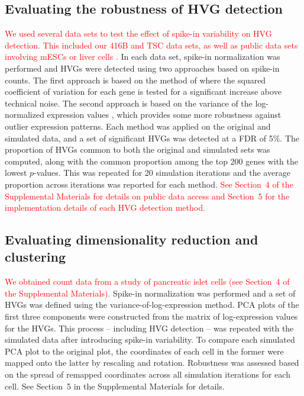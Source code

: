 \documentclass{article}
\newcommand{\suppsecdata}{4}
\newcommand{\suppsecsim}{5}
\newcommand{\revised}[1]{\textcolor{red}{#1}}
\begin{document}
\subsection*{Evaluating the robustness of HVG detection}
\revised{We used several data sets to test the effect of spike-in variability on HVG detection.
This included our 416B and TSC data sets, as well as public data sets involving mESCs \autocite{kolod2015single} or liver cells \autocite{scialdone2015computational}.}
In each data set, spike-in normalization was performed and HVGs were detected using two approaches based on spike-in counts.
The first approach is based on the method of \cite{brennecke2013accounting} where the squared coefficient of variation for each gene is tested for a significant increase above technical noise.
The second approach is based on the variance of the log-normalized expression values \autocite{lun2016stepbystep}, which provides some more robustness against outlier expression patterns.
Each method was applied on the original and simulated data, and a set of significant HVGs was detected at a FDR of 5\%.
The proportion of HVGs common to both the original and simulated sets was computed, along with the common proportion among the top 200 genes with the lowest $p$-values.
This was repeated for 20 simulation iterations and the average proportion across iterations was reported for each method.
\revised{See Section~\suppsecdata{} of the Supplemental Materials for details on public data access and Section~\suppsecsim{} for the implementation details of each HVG detection method.}

\subsection*{Evaluating dimensionality reduction and clustering}
\revised{We obtained count data from a study of pancreatic islet cells \autocite{segerstople2016single} (see Section~\suppsecdata{} of the Supplemental Materials).}
Spike-in normalization was performed and a set of HVGs was defined using the variance-of-log-expression method.
PCA plots of the first three components were constructed from the matrix of log-expression values for the HVGs.
This process -- including HVG detection -- was repeated with the simulated data after introducing spike-in variability.
To compare each simulated PCA plot to the original plot, the coordinates of each cell in the former were mapped onto the latter by rescaling and rotation.
Robustness was assessed based on the spread of remapped coordinates across all simulation iterations for each cell.
See Section~\suppsecsim{} in the Supplemental Materials for details.
\end{document}
